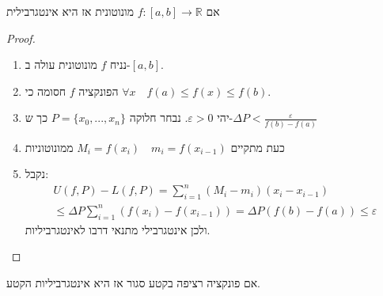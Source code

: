 \documentclass{tstextbook}
\begin{document}
\begin{proposition}
אם \(f:[a,b]\rightarrow \mathbb R\) מונוטונית אז היא אינטגרבילית

\end{proposition}
\begin{proof}
  \begin{enumerate}
    \item נניח \(f\) מונוטונית עולה ב-\([a,b]\). 


    \item הפונקציה \(f\) חסומה כי \(\forall x \quad f(a)\leq f(x)\leq f(b)\). 


    \item יהי \(\varepsilon>0\). נבחר חלוקה \(P=\{x_0,...,x_n\}\) כך ש-\(\Delta P < \frac{\varepsilon}{f(b)-f(a)}\)


    \item כעת מתקיים \(M_i=f(x_i)\quad m_i=f(x_{i-1})\) ממונוטוניות 


    \item נקבל:\\
\begin{gather*}U(f,P)-L(f,P)=\sum_{i=1}^n (M_i-m_i)(x_i-x_{i-1})  \\\leq\Delta P\sum_{i=1}^n (f(x_i)-f(x_{i-1}))=\Delta P(f(b)-f(a))\leq \varepsilon
\end{gather*}
ולכן אינטגרבילי מתנאי דרבו לאינטגרביליות.


  \end{enumerate}
\end{proof}
\begin{proposition}
אם פונקציה רציפה בקטע סגור אז היא אינטגרביליות הקטע.

\end{proposition}
\end{document}
